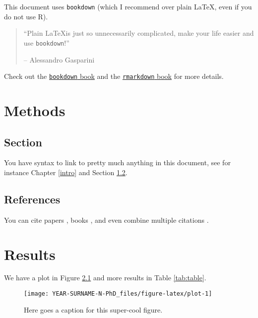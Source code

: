 \documentclass[
  12pt,
  oneside]{book}
\begin{document}
This document uses \texttt{bookdown} (which I recommend over plain \LaTeX, even if you do not use R).

\begin{quote}
``Plain \LaTeX is just so unnecessarily complicated, make your life easier and use \texttt{bookdown}!''

-- Alessandro Gasparini
\end{quote}

Check out the \href{https://bookdown.org/yihui/bookdown/}{\texttt{bookdown} book} and the \href{https://bookdown.org/yihui/rmarkdown/}{\texttt{rmarkdown} book} for more details.

\hypertarget{methods}{%
\chapter{Methods}\label{methods}}

\hypertarget{methods-section}{%
\section{Section}\label{methods-section}}

You have syntax to link to pretty much anything in this document, see for instance Chapter \ref{intro} and Section \ref{methods-references}.

\hypertarget{methods-references}{%
\section{References}\label{methods-references}}

You can cite papers \citep{gasparini_2018}, books \citep{brent_1973}, and even combine multiple citations \citep{R, scopus}.

\hypertarget{results}{%
\chapter{Results}\label{results}}

We have a plot in Figure \ref{fig:plot} and more results in Table \ref{tab:table}.

\begin{figure}

{\centering \texttt{[image: YEAR-SURNAME-N-PhD\_files/figure-latex/plot-1]} 

}

\caption{Here goes a caption for this super-cool figure.}\label{fig:plot}
\end{figure}
\end{document}
